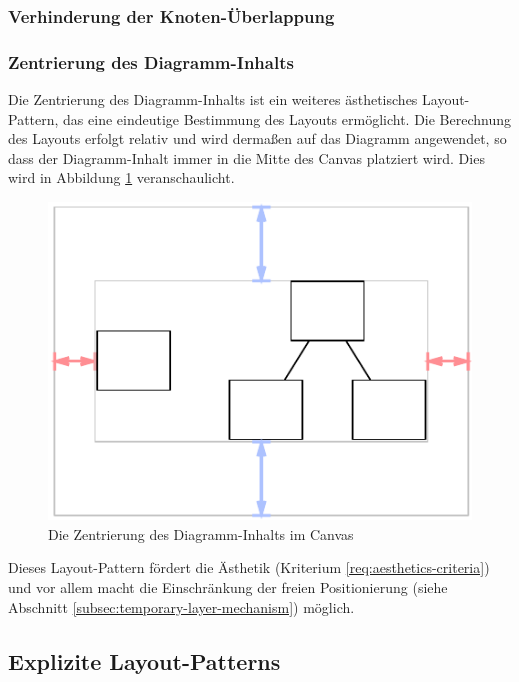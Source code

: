 \subsubsection{Verhinderung der Knoten-Überlappung}


\subsubsection{Zentrierung des Diagramm-Inhalts}
\label{subsubsec:centering-of-diagram-content}

Die Zentrierung des Diagramm-Inhalts ist ein weiteres ästhetisches Layout-Pattern, das eine eindeutige Bestimmung des Layouts ermöglicht. Die Berechnung des Layouts erfolgt relativ und wird dermaßen auf das Diagramm angewendet, so dass der Diagramm-Inhalt immer in die Mitte des Canvas platziert wird. Dies wird in Abbildung \ref{fig:layout-pattern-centered-content} veranschaulicht.

\begin{figure}[hbt]
    \centering
    \includegraphics{resources/layout-pattern-centered-content}
    \caption{Die Zentrierung des Diagramm-Inhalts im Canvas}
    \label{fig:layout-pattern-centered-content}
\end{figure}

Dieses Layout-Pattern fördert die Ästhetik (Kriterium \ref{req:aesthetics-criteria}) und vor allem macht die Einschränkung der freien Positionierung (siehe Abschnitt \ref{subsec:temporary-layer-mechanism}) möglich.

\subsection{Explizite Layout-Patterns}
\label{subsec:explicit-layout-patterns}

